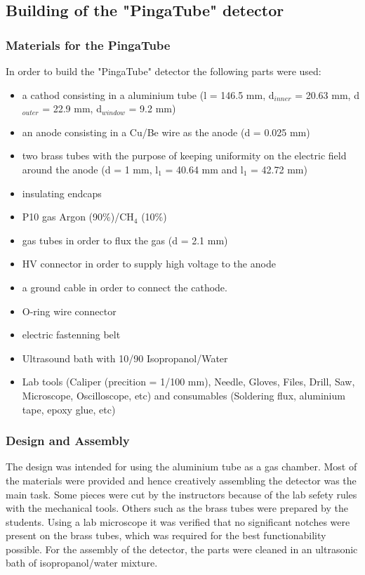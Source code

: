 \subsection{Building of the "PingaTube" detector}
\label{sec:building_pingatube}


\subsubsection{Materials for the PingaTube}
\label{sec:materials_pingatube}

In order to build the "PingaTube" detector the following parts were used:

\begin{itemize}
  \item a cathod consisting in a aluminium tube (l = 146.5 mm, d$_{inner}$ = 20.63  mm, d$_{outer}$ = 22.9 mm, d$_{window}$ = 9.2 mm)
  \item an anode consisting in a Cu/Be wire as the anode (d = 0.025 mm)
  \item two brass tubes with the purpose of keeping uniformity on the electric field around the anode (d = 1 mm, l$_{1}$ = 40.64 mm and l$_{1}$ = 42.72 mm)
  \item insulating endcaps
  \item P10 gas Argon (90\%)/CH$_{4}$ (10\%)
  \item gas tubes in order to flux the gas (d = 2.1 mm)
  \item HV connector in order to supply high voltage to the anode
  \item a ground cable in order to connect the cathode.
  \item O-ring wire connector
  \item electric fastenning belt
  \item Ultrasound bath with 10/90 Isopropanol/Water
  \item Lab tools (Caliper (precition = 1/100 mm), Needle, Gloves, Files, Drill, Saw, Microscope, Oscilloscope, etc) and consumables (Soldering flux, aluminium tape, epoxy glue, etc)  
\end{itemize}

\subsubsection{Design and Assembly}
\label{sec:design_and_assembly_beercan}
The design was intended for using the aluminium tube as a gas chamber. Most of the materials were provided and hence creatively assembling the detector was the main task. 
Some pieces were cut by the instructors because of the lab sefety rules with the mechanical tools. Others such as the brass tubes were prepared by the students. 
Using a lab microscope it was verified that no significant notches were present on the brass tubes, which was required for the best functionability possible.
For the assembly of the detector, the parts were cleaned in an ultrasonic bath of isopropanol/water mixture.


